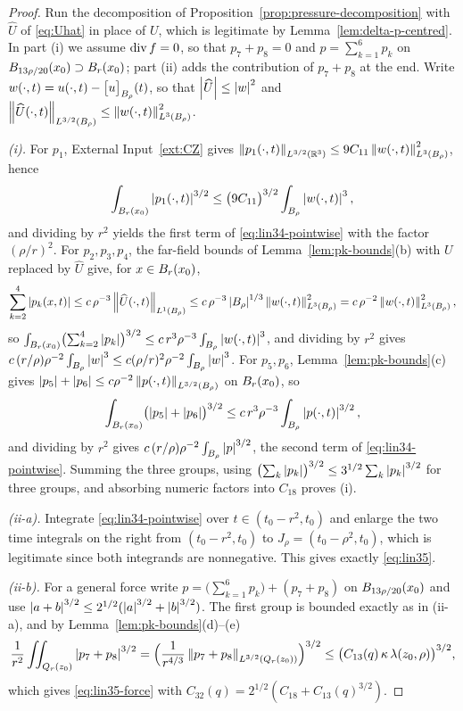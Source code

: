 \documentclass[11pt,reqno]{amsart}
\begin{document}
\begin{proof}
Run the decomposition of Proposition~\ref{prop:pressure-decomposition} with
$\widehat U$ of \eqref{eq:Uhat} in place of $U$, which is legitimate by
Lemma~\ref{lem:delta-p-centred}. In part (i) we assume $\operatorname{div} f=0$, so that
$p_{7}+p_{8}=0$ and $p=\sum_{k=1}^{6}p_{k}$ on
$B_{13\rho/20}(x_{0})\supset B_{r}(x_{0})$; part (ii) adds the
contribution of $p_{7}+p_{8}$ at the end. Write
$w(\cdot,t)=u(\cdot,t)-\bigl[u\bigr]_{B_{\rho}}(t)$, so that
$\left\lvert \widehat U \right\rvert\le\left\lvert w \right\rvert^{2}$ and
$\left\lVert \widehat U(\cdot,t) \right\rVert_{L^{3/2}(B_{\rho})}\le\left\lVert w(\cdot,t) \right\rVert^{2}_{L^{3}(B_{\rho})}$.

\emph{(i).} For $p_{1}$, External Input~\ref{ext:CZ} gives
$\left\lVert p_{1}(\cdot,t) \right\rVert_{L^{3/2}(\mathbb{R}^{3})}\le9C_{11}\left\lVert w(\cdot,t) \right\rVert^{2}_{L^{3}(B_{\rho})}$,
hence
\[
  \int_{B_{r}(x_{0})}\left\lvert p_{1}(\cdot,t) \right\rvert^{3/2}
  \le\bigl(9C_{11}\bigr)^{3/2}\int_{B_{\rho}}\left\lvert w(\cdot,t) \right\rvert^{3},
\]
and dividing by $r^{2}$ yields the first term of \eqref{eq:lin34-pointwise}
with the factor $(\rho/r)^{2}$. For $p_{2},p_{3},p_{4}$, the far-field bounds of
Lemma~\ref{lem:pk-bounds}(b) with $U$ replaced by $\widehat U$ give, for
$x\in B_{r}(x_{0})$,
\[
  \sum_{k=2}^{4}\left\lvert p_{k}(x,t) \right\rvert
  \le c\,\rho^{-3}\left\lVert \widehat U(\cdot,t) \right\rVert_{L^{1}(B_{\rho})}
  \le c\,\rho^{-3}\left\lvert B_{\rho} \right\rvert^{1/3}\left\lVert w(\cdot,t) \right\rVert^{2}_{L^{3}(B_{\rho})}
  = c\,\rho^{-2}\left\lVert w(\cdot,t) \right\rVert^{2}_{L^{3}(B_{\rho})} ,
\]
so
$\int_{B_{r}(x_{0})}\bigl(\sum_{k=2}^{4}\left\lvert p_{k} \right\rvert\bigr)^{3/2}
 \le c\,r^{3}\rho^{-3}\int_{B_{\rho}}\left\lvert w(\cdot,t) \right\rvert^{3}$, and dividing by
$r^{2}$ gives $c\,(r/\rho)\rho^{-2}\int_{B_{\rho}}\left\lvert w \right\rvert^{3}
\le c(\rho/r)^{2}\rho^{-2}\int_{B_{\rho}}\left\lvert w \right\rvert^{3}$. For $p_{5},p_{6}$,
Lemma~\ref{lem:pk-bounds}(c) gives
$\left\lvert p_{5} \right\rvert+\left\lvert p_{6} \right\rvert\le c\rho^{-2}\left\lVert p(\cdot,t) \right\rVert_{L^{3/2}(B_{\rho})}$ on
$B_{r}(x_{0})$, so
\[
  \int_{B_{r}(x_{0})}\bigl(\left\lvert p_{5} \right\rvert+\left\lvert p_{6} \right\rvert\bigr)^{3/2}
  \le c\,r^{3}\rho^{-3}\int_{B_{\rho}}\left\lvert p(\cdot,t) \right\rvert^{3/2},
\]
and dividing by $r^{2}$ gives $c\,(r/\rho)\rho^{-2}\int_{B_{\rho}}\left\lvert p \right\rvert^{3/2}$,
the second term of \eqref{eq:lin34-pointwise}. Summing the three groups, using
$\bigl(\sum_{k}\left\lvert p_{k} \right\rvert\bigr)^{3/2}\le3^{1/2}\sum_{k}\left\lvert p_{k} \right\rvert^{3/2}$ for
three groups, and absorbing numeric factors into $C_{18}$ proves (i).

\emph{(ii-a).} Integrate \eqref{eq:lin34-pointwise} over
$t\in(t_{0}-r^{2},t_{0})$ and enlarge the two time integrals on the right from
$(t_{0}-r^{2},t_{0})$ to $J_{\rho}=(t_{0}-\rho^{2},t_{0})$, which is legitimate
since both integrands are nonnegative. This gives exactly \eqref{eq:lin35}.

\emph{(ii-b).} For a general force write $p=\bigl(\sum_{k=1}^{6}p_{k}\bigr)
+(p_{7}+p_{8})$ on $B_{13\rho/20}(x_{0})$ and use
$\left\lvert a+b \right\rvert^{3/2}\le2^{1/2}(\left\lvert a \right\rvert^{3/2}+\left\lvert b \right\rvert^{3/2})$. The first group is
bounded exactly as in (ii-a), and by Lemma~\ref{lem:pk-bounds}(d)--(e)
\[
  \frac1{r^{2}}\iint_{Q_{r}(z_{0})}\left\lvert p_{7}+p_{8} \right\rvert^{3/2}
  =\Bigl(\frac{1}{r^{4/3}}\left\lVert p_{7}+p_{8} \right\rVert_{L^{3/2}(Q_{r}(z_{0}))}\Bigr)^{3/2}
  \le\bigl(C_{13}(q)\,\kappa\,\lambda(z_{0},\rho)\bigr)^{3/2},
\]
which gives \eqref{eq:lin35-force} with
$C_{32}(q)=2^{1/2}(C_{18}+C_{13}(q)^{3/2})$.
\end{proof}
\end{document}
